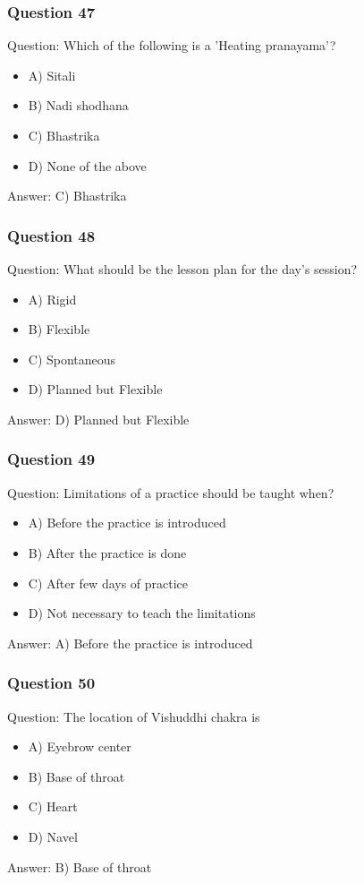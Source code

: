 \begin{frame}[fragile]\frametitle{Question 47}
Question: Which of the following is a 'Heating pranayama'?
\begin{itemize}
\item A) Sitali
\item B) Nadi shodhana
\item C) Bhastrika
\item D) None of the above
\end{itemize}
Answer: C) Bhastrika
\end{frame}

\begin{frame}[fragile]\frametitle{Question 48}
Question: What should be the lesson plan for the day's session?
\begin{itemize}
\item A) Rigid
\item B) Flexible
\item C) Spontaneous
\item D) Planned but Flexible
\end{itemize}
Answer: D) Planned but Flexible
\end{frame}

\begin{frame}[fragile]\frametitle{Question 49}
Question: Limitations of a practice should be taught when?
\begin{itemize}
\item A) Before the practice is introduced
\item B) After the practice is done
\item C) After few days of practice
\item D) Not necessary to teach the limitations
\end{itemize}
Answer: A) Before the practice is introduced
\end{frame}

\begin{frame}[fragile]\frametitle{Question 50}
Question: The location of Vishuddhi chakra is
\begin{itemize}
\item A) Eyebrow center
\item B) Base of throat
\item C) Heart
\item D) Navel
\end{itemize}
Answer: B) Base of throat
\end{frame}

